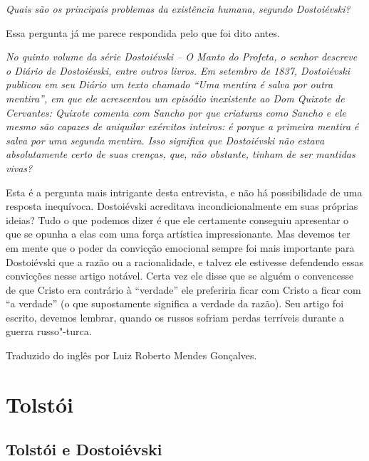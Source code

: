 \medskip

\emph{Quais são os principais problemas da existência humana, segundo
Dostoiévski?}

Essa pergunta já me parece respondida pelo que foi dito antes.

\medskip

\emph{No quinto volume da série \emph{Dostoiévski -- O Manto do Profeta}, o
senhor descreve o \emph{Diário} de Dostoiévski, entre outros livros.
Em setembro de 1837, Dostoiévski publicou em seu \emph{Diário} um texto
chamado ``Uma mentira é salva por outra mentira'', em que ele acrescentou
um episódio inexistente ao \emph{Dom Quixote} de Cervantes: Quixote comenta
com Sancho por que criaturas como Sancho e ele mesmo são capazes de aniquilar exércitos
inteiros: é porque a primeira mentira é salva por uma segunda mentira.
Isso significa que Dostoiévski não estava absolutamente certo de suas
crenças, que, não obstante, tinham de ser mantidas vivas?}

Esta é a pergunta mais intrigante desta entrevista, e não há
possibilidade de uma resposta inequívoca. Dostoiévski acreditava
incondicionalmente em suas próprias ideias? Tudo o que podemos dizer é
que ele certamente conseguiu apresentar o que se opunha a elas com uma
força artística impressionante. Mas devemos ter em mente que o poder da
convicção emocional sempre foi mais importante para Dostoiévski que a
razão ou a racionalidade, e talvez ele estivesse defendendo essas
convicções nesse artigo notável. Certa vez ele disse que se alguém o
convencesse de que Cristo era contrário à ``verdade'' ele preferiria ficar
com Cristo a ficar com ``a verdade'' (o que supostamente significa a
verdade da razão). Seu artigo foi escrito, devemos lembrar, quando os
russos sofriam perdas terríveis durante a guerra russo"-turca.

\medskip

\noindent
Traduzido do inglês por Luiz Roberto Mendes Gonçalves.



\part{Tolstói}

\chapter{Tolstói e Dostoiévski}


